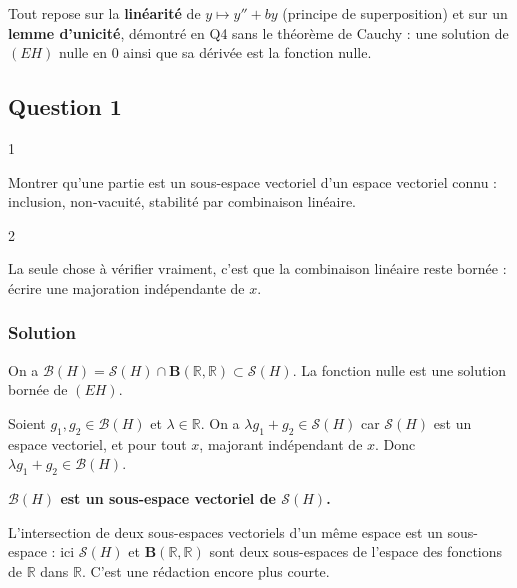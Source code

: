 \documentclass[11pt,a4paper]{article}
\newcommand{\equationajustee}[1]{%
  \sbox{\boiteequation}{$\displaystyle #1$}%
  \ifdim\wd\boiteequation>\linewidth
    \[\resizebox{\linewidth}{!}{\usebox{\boiteequation}}\]%
  \else
    \[#1\]%
  \fi}
\begin{document}
Tout repose sur la \textbf{linéarité} de \(y\mapsto y''+by\) (principe de superposition) et sur un \textbf{lemme d'unicité}, démontré en Q4 sans le théorème de Cauchy : une solution de \((EH)\) nulle en \(0\) ainsi que sa dérivée est la fonction nulle.

\hypertarget{question-1}{%
\subsection{Question 1}\label{question-1}}

\begin{indication}{1}

Montrer qu'une partie est un sous-espace vectoriel d'un espace vectoriel connu : inclusion, non-vacuité, stabilité par combinaison linéaire.

\end{indication}

\begin{indication}{2}

La seule chose à vérifier vraiment, c'est que la combinaison linéaire reste bornée : écrire une majoration indépendante de \(x\).

\end{indication}

\hypertarget{solution}{%
\subsubsection{Solution}\label{solution}}

On a \(\mathcal B(H)=\mathcal S(H)\cap\mathbf B(\mathbb R,\allowbreak \mathbb R)\subset\mathcal S(H)\). La fonction nulle est une solution bornée de \((EH)\).

Soient \(g_1,g_2\in\mathcal B(H)\) et \(\lambda\in\mathbb R\). On a \(\lambda g_1+g_2\in\mathcal S(H)\) car \(\mathcal S(H)\) est un espace vectoriel, et pour tout \(x\),
\equationajustee{|\lambda g_1(x)+g_2(x)|\le|\lambda|\,\|g_1\|+\|g_2\|,}
majorant indépendant de \(x\). Donc \(\lambda g_1+g_2\in\mathcal B(H)\).

\textbf{\(\mathcal B(H)\) est un sous-espace vectoriel de \(\mathcal S(H)\).}

\begin{methode}

L'intersection de deux sous-espaces vectoriels d'un même espace est un sous-espace : ici \(\mathcal S(H)\) et \(\mathbf B(\mathbb R,\mathbb R)\) sont deux sous-espaces de l'espace des fonctions de \(\mathbb R\) dans \(\mathbb R\). C'est une rédaction encore plus courte.

\end{methode}
\end{document}
